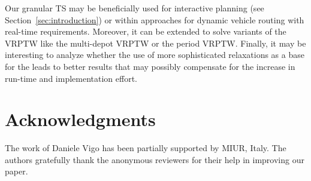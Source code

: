 \documentclass[11pt,a4paper,fleqn]{article}
\begin{document}
Our granular TS may be beneficially used for interactive planning (see Section~\ref{sec:introduction}) or within approaches for dynamic vehicle routing with real-time requirements.  Moreover, it can be extended to solve variants of the VRPTW like the multi-depot VRPTW or the period VRPTW. Finally, it may be interesting to analyze whether the use of more sophisticated relaxations as a base for the \smslong leads to better results that may possibly compensate for the increase in run-time and implementation effort.

\section*{Acknowledgments} 
The work of Daniele Vigo has been partially supported by MIUR, Italy. The authors gratefully thank the anonymous reviewers for their help in improving our paper.

\clearpage

\end{document}
